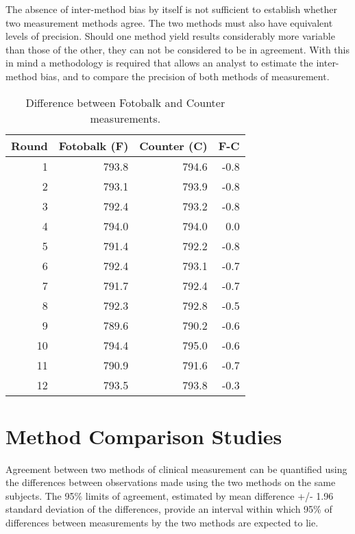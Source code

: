 \documentclass[12pt, a4paper]{report}
\begin{document}
		The absence of inter-method bias by itself is not sufficient to
		establish whether two measurement methods agree. The two methods
		must also have equivalent levels of precision. Should one method
		yield results considerably more variable than those of the other,
		they can not be considered to be in agreement. With this in mind a
		methodology is required that allows an analyst to estimate the
		inter-method bias, and to compare the precision of both methods of
		measurement.
		\newpage
		\begin{table}[h!]
			
			\begin{center}
				
				\begin{tabular}{rrrr}
					\hline
					Round& Fotobalk (F) & Counter (C) & F-C \\
					\hline
					1 & 793.8& 794.6 & -0.8 \\
					2 & 793.1 & 793.9 & -0.8 \\
					3 & 792.4 & 793.2 & -0.8 \\
					4 & 794.0 & 794.0 & 0.0 \\
					5 & 791.4 & 792.2 & -0.8 \\
					6 & 792.4 & 793.1 & -0.7 \\
					7 & 791.7 & 792.4 & -0.7 \\
					8 & 792.3 & 792.8 & -0.5 \\
					9 & 789.6 & 790.2 & -0.6 \\
					10 & 794.4 & 795.0 & -0.6 \\
					11 & 790.9 & 791.6 & -0.7 \\
					12 & 793.5 & 793.8 & -0.3 \\
					\hline
				\end{tabular}
				\caption{Difference between Fotobalk and Counter measurements.}
			\end{center}
		\end{table}
		
		\bigskip
		
		\newpage

	\section{Method Comparison Studies}
	
	Agreement between two methods of clinical measurement can be quantified using the differences between observations made using the two methods on the same subjects. The 95\% limits of agreement, estimated by mean difference +/- 1.96 standard deviation of the differences, provide an interval within which 95\% of differences between measurements by the two methods are expected to lie.
	
\end{document}
